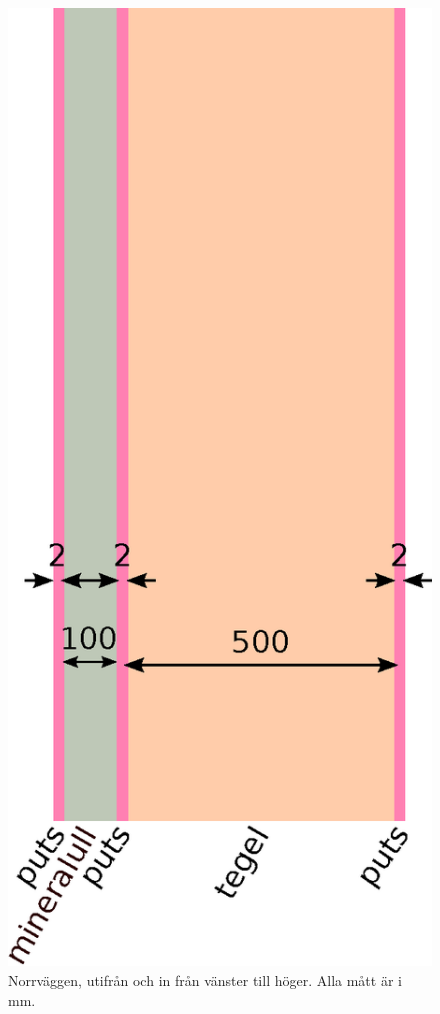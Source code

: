 \begin{figure}[hpbt]
\centering
\includegraphics[height=0.3\textheight]{images/norrvagg.eps}
\caption{\label{fig:norrvagg}{Norrväggen, utifrån och in från vänster till höger. Alla mått är i mm.}}
\end{figure}

